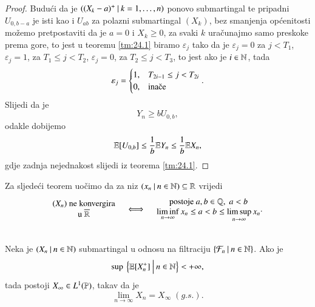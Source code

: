 \begin{proof}
    Budu\' ci da je $({(X_k - a)^+} \: | \: {k = 1, \ldots, n})$ ponovo submartingal te pripadni $U_{0, b - a}$ je isti kao i $U_{a b}$ za polazni submartingal $(X_k)$, bez smanjenja op\' cenitosti mo\v zemo pretpostaviti da je $a = 0$ i $X_k \geq 0$, za svaki $k$ ura\v cunajmo samo preskoke prema gore, to jest u teoremu \ref{tm:24.1} biramo $\varepsilon_j$ tako da je $\varepsilon_j = 0$ za $j < T_1$, $\varepsilon_j = 1$, za $T_1 \leq j < T_2$, $\varepsilon_j = 0$, za $T_2 \leq j < T_3$, to jest ako je $i \in \mathbb{N}$, tada
    \begin{equation*}
        \varepsilon_j =
        \begin{cases}
            1 ,& T_{2 i - 1} \leq j < T_{2 i}\\
            0 ,& \textnormal{ina\v ce}
        \end{cases}.
    \end{equation*}
    Slijedi da je
    \begin{equation*}
        Y_n \geq b U_{0, b},
    \end{equation*}
    odakle dobijemo
    \begin{equation*}
        \mathbb{E} [U_{0, b}] \leq \frac{1}{b} \mathbb{E} Y_n \leq \frac{1}{b} \mathbb{E} X_n,
    \end{equation*}
    gdje zadnja nejednakost slijedi iz teorema \ref{tm:24.1}.
\end{proof}

Za sljede\' ci teorem uo\v cimo da za niz $({x_n} \: | \: {n \in \mathbb{N}}) \subseteq \mathbb{R}$ vrijedi
\begin{equation}    \label{jed:24.3}
    \begin{matrix}
        (X_n) \textnormal{ ne konvergira}\\
        \textnormal{u } \overline{\mathbb{R}}
    \end{matrix}
    \quad \iff \quad
    \begin{matrix}
        \textnormal{postoje } a, b \in \mathbb{Q}, \; a < b\\
        \liminf\limits_{n \to \infty} x_n \leq a < b \leq \limsup\limits_{n \to \infty} x_n
    \end{matrix}.
\end{equation}

\begin{tm}   \label{tm:24.4}
    \quad \\
    Neka je $({X_n} \: | \: {n \in \mathbb{N}})$ submartingal u odnosu na filtraciju $\{{\mathcal{F}_n} \: | \: {n \in \mathbb{N}}\}$.
    Ako je
    \begin{equation*}
        \sup \: \Big\{{\mathbb{E} [ X_n^+]} \: \Big| \: {n \in \mathbb{N}}\Big\} < +\infty,
    \end{equation*}
    tada postoji $X_\infty \in L^1(\mathbb{P})$, takav da je
    \begin{equation*}
        \lim\limits_{n \to \infty} X_n = X_\infty \; (g.s.).
    \end{equation*}
\end{tm}

